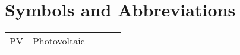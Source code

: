 \chapter*{Symbols and Abbreviations}

\begin{flushleft}
\begin{longtable}{l p{0.8\linewidth}}
PV      & Photovoltaic\\
\end{longtable}
\end{flushleft}

